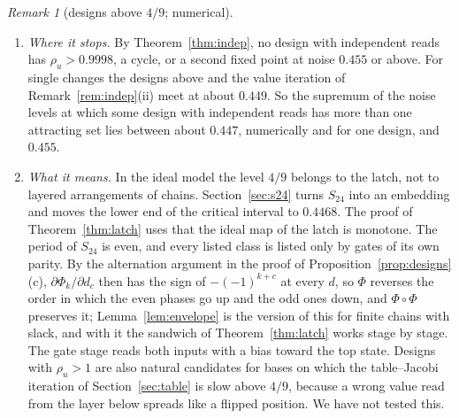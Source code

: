 \documentclass[11pt]{amsart}
\theoremstyle{definition}
\theoremstyle{remark}
\newtheorem{remark}[theorem]{Remark}
\begin{document}
\begin{remark}[designs above $4/9$; numerical]
\begin{enumerate}[label=(\roman*),leftmargin=2.4em]
entries $0.35$, the density map converges to a cycle $\{a,\Phi(a)\}$ of length two with
$\|\Phi(a)-a\|_\infty=0.130$, and the Jacobian of $\Phi\circ\Phi$ at $a$ has spectral radius
$0.983$, so the cycle is attracting. Then $\Phi\circ\Phi$ has the two attracting fixed points $a$
and $\Phi(a)$, as the ideal map of the latch has $L$ and its mirror image below $4/9$, and a pair
of layers keeps a bit: the phase of the oscillation. The amplitude $\|\Phi(a)-a\|_\infty$ is
$0.146$ at noise $0.4444445$, $0.130$ at $0.445$, $0.097$ at $0.446$ and $0.040$ at $0.447$; at
$0.448$ the iteration from the same start converges to the fixed point, where $\rho_s=0.998$. On smoothed instances, $60$ layers of $240000$ positions with the
first layer prepared in one phase, the referee found the alternating pattern still present in
layers $50$ to $59$ at noise $0.445$, with $0.83\pm0.09$ times the ideal amplitude over eight
seeds, and $0.23\pm0.07$ at noise $0.46$, where the ideal value after the same number of layers is
about $0.25$; at this size the run cannot tell a multiplier of $1.004$ from one of $0.999$.
\item \emph{Where it stops.} By Theorem~\ref{thm:indep}, no design with independent reads has
$\rho_u>0.9998$, a cycle, or a second fixed point at noise $0.455$ or above. For single changes
the designs above and the value iteration of Remark~\ref{rem:indep}(ii) meet at about $0.449$.
So the supremum of the noise levels at which some design with independent reads has more than one
attracting set lies between about $0.447$, numerically and for one design, and $0.455$.
\item \emph{What it means.} In the ideal model the level $4/9$ belongs to the latch, not to
layered arrangements of chains. Section~\ref{sec:s24} turns $S_{24}$ into an embedding and moves
the lower end of the critical interval to $0.4468$. The proof of Theorem~\ref{thm:latch} uses that
the ideal map of the latch is monotone. The period of $S_{24}$ is even, and every listed class is
listed only by gates of its own parity. By the alternation argument in the proof of
Proposition~\ref{prop:designs}(c), $\partial\Phi_k/\partial d_c$ then has the sign of
$-(-1)^{k+c}$ at every $d$, so $\Phi$ reverses the order in which the even phases go up and the odd
ones down, and $\Phi\circ\Phi$ preserves it; Lemma~\ref{lem:envelope} is the version of this for
finite chains with slack, and with it the sandwich of Theorem~\ref{thm:latch} works stage by stage.
The gate stage reads both inputs with a bias toward the top state. Designs with $\rho_u>1$ are also
natural candidates for bases on which the table--Jacobi iteration of Section~\ref{sec:table} is
slow above $4/9$, because a wrong value read from the layer below spreads like a flipped position.
We have not tested this.
\end{enumerate}
\end{remark}
\end{document}
